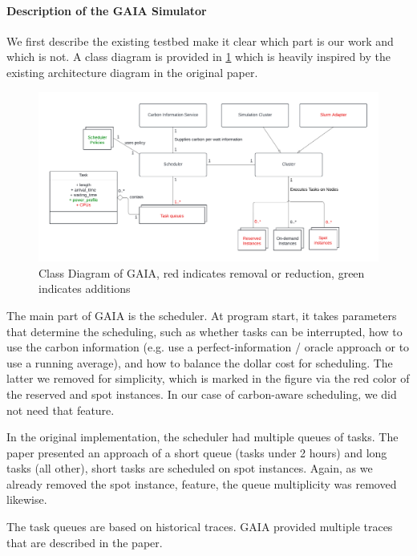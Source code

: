\paragraph{Description of the GAIA Simulator}

We first describe the existing testbed make it clear which part is our work and which is not. A class diagram is provided in \ref{fig:class_diagram} which is heavily inspired by the existing architecture diagram in the original paper. 

\begin{figure}
    \includegraphics[width=\linewidth]{images/MA Thesis Diagram.pdf}
    \caption{Class Diagram of GAIA, red indicates removal or reduction, green indicates additions}
    \label{fig:class_diagram}
\end{figure}

The main part of GAIA is the scheduler. At program start, it takes parameters that determine the scheduling, such as whether tasks can be interrupted, how to use the carbon information (e.g. use a perfect-information / oracle approach or to use a running average), and how to balance the dollar cost for scheduling. 
The latter we removed for simplicity, which is marked in the figure via the red color of the reserved and spot instances. In our case of carbon-aware scheduling, we did not need that feature.

In the original implementation, the scheduler had multiple queues of tasks. 
The paper presented an approach of a short queue (tasks under 2 hours) and long tasks (all other), short tasks are scheduled on spot instances. 
Again, as we already removed the spot instance, feature, the queue multiplicity was removed likewise.

The task queues are based on historical traces. GAIA provided multiple traces that are described in the paper.

